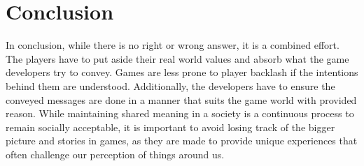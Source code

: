 \documentclass{scrartcl}
\begin{document}
\section{Conclusion}
In conclusion, while there is no right or wrong answer, it is a combined effort. The players have to put aside their real world values and absorb what the game developers try to convey. Games are less prone to player backlash if the intentions behind them are understood. Additionally, the developers have to ensure the conveyed messages are done in a manner that suits the game world with provided reason. While maintaining shared meaning in a society is a continuous process to remain socially acceptable, it is important to avoid losing track of the bigger picture and stories in games, as they are made to provide unique experiences that often challenge our perception of things around us. 





\end{document}
